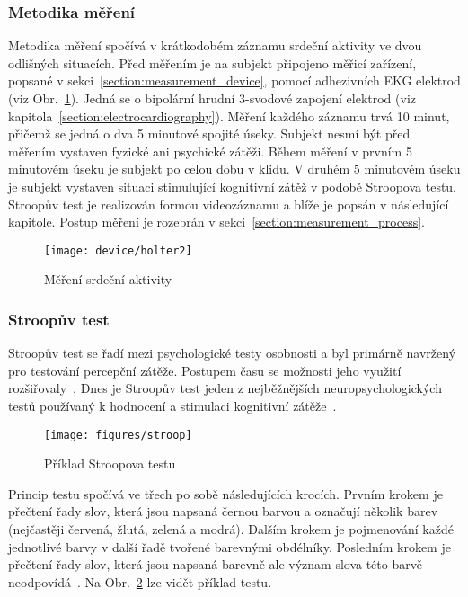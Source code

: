 \subsubsection{Metodika měření}
\label{section:measurement_methodology}
Metodika měření spočívá v krátkodobém záznamu srdeční aktivity ve dvou odlišných
situacích. Před měřením je na subjekt připojeno měřicí zařízení, popsané v
sekci~\ref{section:measurement_device}, pomocí adhezivních EKG elektrod (viz
Obr.~\ref{fig:device_usage}). Jedná se o bipolární hrudní 3-svodové zapojení
elektrod (viz kapitola~\ref{section:electrocardiography}). Měření každého
záznamu trvá 10 minut, přičemž se jedná o dva 5 minutové spojité úseky. Subjekt
nesmí být před měřením vystaven fyzické ani psychické zátěži. Během měření v
prvním 5 minutovém úseku je subjekt po celou dobu v klidu. V druhém 5 minutovém
úseku je subjekt vystaven situaci stimulující kognitivní zátěž v podobě
Stroopova testu. Stroopův test je realizován formou videozáznamu a blíže je
popsán v následující kapitole. Postup měření je rozebrán v
sekci~\ref{section:measurement_process}.

\begin{figure}[h]
    \begin{center}
        \texttt{[image: device/holter2]}
        \caption{Měření srdeční aktivity}
        \label{fig:device_usage}
    \end{center}
\end{figure}

\subsubsection{Stroopův test}
\label{section:stroop_test}
Stroopův test se řadí mezi psychologické testy osobnosti a byl primárně navržený
pro testování percepční zátěže. Postupem času se možnosti jeho využití
rozšiřovaly~\cite{Svoboda1999}. Dnes je Stroopův test jeden z nejběžnějších
neuropsychologických testů používaný k hodnocení  a stimulaci kognitivní
zátěže~\cite{Scarpina2017}.

\begin{figure}[h]
    \begin{center}
        \texttt{[image: figures/stroop]}
        \caption{Příklad Stroopova testu~\cite{stroopWiki}}
        \label{fig:stroop}
    \end{center}
\end{figure}

Princip testu spočívá ve třech po sobě následujících krocích. Prvním krokem je
přečtení řady slov, která jsou napsaná černou barvou a označují několik barev
(nejčastěji červená, žlutá, zelená a modrá). Dalším krokem je pojmenování každé
jednotlivé barvy v další řadě tvořené barevnými obdélníky. Posledním krokem je
přečtení řady slov, která jsou napsaná barevně ale význam slova této barvě
neodpovídá~\cite{Svoboda1999}. Na Obr.~\ref{fig:stroop} lze vidět příklad testu.

